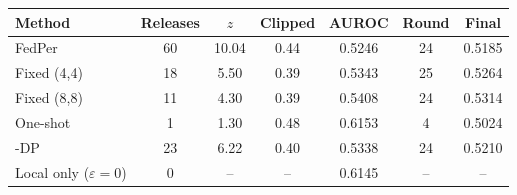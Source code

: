 \begin{tabular}{@{}lcccccc@{}}
\toprule
Method & Releases & $z$ & Clipped & AUROC & Round & Final\\
\midrule
FedPer & 60 & 10.04 & 0.44 & 0.5246 & 24 & 0.5185\\
Fixed (4,4) & 18 & 5.50 & 0.39 & 0.5343 & 25 & 0.5264\\
Fixed (8,8) & 11 & 4.30 & 0.39 & 0.5408 & 24 & 0.5314\\
One-shot & 1 & 1.30 & 0.48 & 0.6153 & 4 & 0.5024\\
\tierfed{}-DP & 23 & 6.22 & 0.40 & 0.5338 & 24 & 0.5210\\
\midrule
Local only ($\varepsilon=0$) & 0 & -- & -- & 0.6145 & -- & --\\
\bottomrule
\end{tabular}
